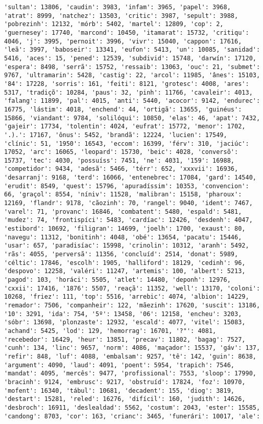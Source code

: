 \begin{Verbatim}[commandchars=\\\{\}]
'sultan': 13806, 'caudin': 3983, 'infam': 3965, 'papel': 3968, 'atrat': 8999, 'natchez': 13503, 'critic': 3987, 'sepult': 3988, 'pobrezinh': 12132, 'mórb': 5402, 'martel': 12809, 'cop': 2, 'guernesey': 17740, 'marcond': 10450, 'itamarat': 15732, 'critiqu': 4046, 'j': 3995, 'pernoit': 3996, 'vivr': 15040, 'cappon': 17616, 'leã': 3997, 'baboseir': 13341, 'eufon': 5413, 'un': 10085, 'sanidad': 5416, 'aces': 15, 'pened': 12539, 'subdivid': 15748, 'darwín': 17120, 'espera': 8498, 'serrã': 15752, 'ressaib': 13063, 'ouc': 21, 'submet': 9767, 'ultramarin': 5428, 'castig': 22, 'arcol': 11985, 'ânes': 15103, '84': 17228, 'sorris': 161, 'feiti': 8121, 'grotesc': 4008, 'ares': 5317, 'tradiçõ': 10284, 'paus': 32, 'pinh': 11766, 'cavaleir': 4013, 'falang': 11899, 'pal': 4015, 'anti': 5440, 'acocor': 9142, 'endurec': 16775, 'lástim': 4018, 'enchend': 44, 'ortigã': 13655, 'guinéus': 15866, 'viandant': 9784, 'solilóqui': 10850, 'elas': 46, 'apat': 7432, 'gajeir': 17734, 'tolentin': 4024, 'eufrat': 15772, 'menor': 1702, '.).': 17167, 'ônus': 5452, 'brandã': 12224, 'lucien': 17549, 'clínic': 51, '1950': 16543, 'eccom': 16399, 'férv': 310, 'jaciúc': 17052, 'arc': 16065, 'leopard': 15730, 'beic': 4028, 'conversõ': 15737, 'tec': 4030, 'possuíss': 7451, 'ne': 4031, '159': 16988, 'competidor': 9434, 'adesã': 5466, 'térr': 652, 'xxxvii': 16936, 'desarranj': 9168, 'terd': 16066, 'entenebrec': 17084, 'gard': 14540, 'erudit': 8549, 'quest': 15796, 'apuradíssim': 10353, 'convencion': 66, 'graçol': 8554, 'níniv': 11528, 'malibran': 15158, 'pharoux': 12169, 'flandr': 9178, 'cãozinh': 70, 'rangel': 9040, 'ident': 7467, 'varel': 71, 'provanc': 16846, 'combatent': 5480, 'espald': 5481, 'mudez': 74, 'frontispíci': 5483, 'cardíac': 12426, 'desdenh': 4047, 'estibord': 10692, 'filigran': 14699, 'joelh': 1700, 'exaust': 80, 'navegu': 11312, 'bonitinh': 4048, 'obé': 13654, 'pacatu': 15446, 'usar': 657, 'paradisíac': 15998, 'crinolin': 10312, 'aranh': 5492, 'rãs': 4055, 'perversã': 11356, 'concluíd': 2514, 'donat': 5989, 'céltic': 17846, 'escolh': 1905, 'halliford': 18129, 'cedinh': 96, 'despovo': 12258, 'valéri': 11247, 'artemis': 100, 'albert': 5213, 'pagod': 103, 'horáci': 5505, 'atlet': 14480, 'deponh': 12976, 'cxxii': 17416, '1876': 5507, 'reaçã': 11352, 'well': 13170, 'coloni': 10268, 'friez': 111, 'top': 5516, 'arrebic': 4074, 'albion': 14229, 'remador': 7506, 'companheir': 122, 'mãezinh': 17620, 'suscit': 13186, '10': 3291, 'ida': 754, '5º': 13458, '06': 12158, 'encheu': 3203, 'sóbr': 13698, 'plonzaste': 12932, 'escald': 4077, 'vitel': 15083, 'achand': 5425, 'lod': 129, 'hemorrag': 16701, '?"': 4081, 'recebedor': 16429, 'heur': 13851, 'precav': 11802, 'bagag': 7527, 'cunh': 134, 'linc': 9657, 'norm': 4086, 'maçador': 15537, 'gáv': 137, 'refir': 848, 'luf': 4088, 'embalsam': 9257, 'tê': 142, 'guin': 8638, 'argument': 4090, 'laud': 4091, 'poent': 5954, 'trapich': 7546, 'mandat': 4095, 'mercês': 9477, 'profissional': 7553, 'sloop': 17990, 'bracinh': 9124, 'embrusc': 9217, 'obstruíd': 17824, 'foz': 10970, 'mofent': 16340, 'tábul': 10681, 'decadent': 155, 'diog': 3819, 'destart': 15281, 'reled': 16276, 'difícil': 160, 'judith': 14626, 'desbroch': 16911, 'deslealdad': 5562, 'costum': 2043, 'ester': 15585, 'candong': 8703, 'cor': 163, 'crianc': 3465, 'funerári': 10017, 'ale': 
\end{Verbatim}
